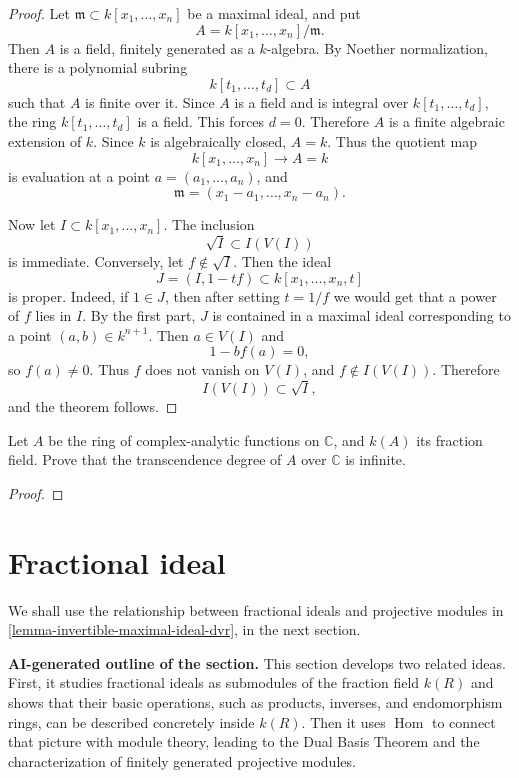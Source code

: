 \begin{proof}
Let $\mathfrak{m}\subset k[x_1,\ldots,x_n]$
be a maximal ideal, and put
$$
A=k[x_1,\ldots,x_n]/\mathfrak{m}.
$$
Then $A$ is a field, finitely generated
as a $k$-algebra.
By Noether normalization, there is a
polynomial subring
$$
k[t_1,\ldots,t_d]\subset A
$$
such that $A$ is finite over it.
Since $A$ is a field and is integral over
$k[t_1,\ldots,t_d]$, the ring
$k[t_1,\ldots,t_d]$ is a field.
This forces $d=0$.
Therefore $A$ is a finite algebraic
extension of $k$.
Since $k$ is algebraically closed, $A=k$.
Thus the quotient map
$$
k[x_1,\ldots,x_n]\to A=k
$$
is evaluation at a point
$a=(a_1,\ldots,a_n)$, and
$$
\mathfrak{m}
=(x_1-a_1,\ldots,x_n-a_n).
$$

Now let $I\subset k[x_1,\ldots,x_n]$.
The inclusion
$$
\sqrt{I}\subset I(V(I))
$$
is immediate.
Conversely, let $f\notin \sqrt{I}$.
Then the ideal
$$
J=(I,1-tf)\subset k[x_1,\ldots,x_n,t]
$$
is proper.
Indeed, if $1\in J$, then after setting
$t=1/f$ we would get that a power of $f$
lies in $I$.
By the first part, $J$ is contained in a
maximal ideal corresponding to a point
$(a,b)\in k^{n+1}$.
Then $a\in V(I)$ and
$$
1-bf(a)=0,
$$
so $f(a)\neq 0$.
Thus $f$ does not vanish on $V(I)$, and
$f\notin I(V(I))$.
Therefore
$$
I(V(I))\subset \sqrt{I},
$$
and the theorem follows.
\end{proof}

\begin{exercise}
\label{exercise-trans-deg-hol-functions}
Let $A$ be the ring of complex-analytic
functions on $\mathbb{C}$,
and $k(A)$ its fraction field.
Prove that the transcendence degree
of $A$ over $\mathbb{C}$ is infinite.
\end{exercise}

\begin{proof}

\end{proof}

\section{Fractional ideal}
\label{section-fractional-ideals}

\noindent
We shall use the relationship
between fractional ideals and
projective modules in
\ref{lemma-invertible-maximal-ideal-dvr},
in the next section.

\medskip\noindent
{\bf AI-generated outline of the section.}
This section develops two related ideas. First,
it studies fractional ideals as submodules of
the fraction field $k(R)$ and shows that their
basic operations, such as products, inverses,
and endomorphism rings, can be described
concretely inside $k(R)$. Then it uses
$\operatorname{Hom}$ to connect that picture
with module theory, leading to the Dual Basis
Theorem and the characterization of finitely
generated projective modules.

